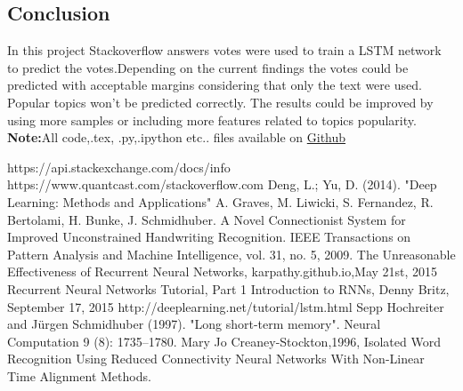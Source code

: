 \documentclass{article}
\begin{document}
\begin{multicols*}{2}
\begin{flushleft}
\section{Conclusion}
In this project Stackoverflow answers votes were used to train a LSTM network to predict the votes.Depending on the current findings the votes could be predicted with acceptable margins considering that only the text were used. Popular topics won't be predicted correctly. The results could be improved by using more samples or including more features related to topics popularity.\\
\textbf{Note:}All code,.tex, .py,.ipython etc.. files available on \href{https://github.com/aqeel13932/RSDM2016/}{Github}
	\begin{thebibliography}{9}
		https://api.stackexchange.com/docs/info
		https://www.quantcast.com/stackoverflow.com
		Deng, L.; Yu, D. (2014). "Deep Learning: Methods and Applications"
		A. Graves, M. Liwicki, S. Fernandez, R. Bertolami, H. Bunke, J. Schmidhuber. A Novel Connectionist System for Improved Unconstrained Handwriting Recognition. IEEE Transactions on Pattern Analysis and Machine Intelligence, vol. 31, no. 5, 2009.
		The Unreasonable Effectiveness of Recurrent Neural Networks,	    karpathy.github.io,May 21st, 2015
		Recurrent Neural Networks Tutorial, Part 1 Introduction to RNNs, Denny Britz, September 17, 2015	
		http://deeplearning.net/tutorial/lstm.html
		 Sepp Hochreiter and Jürgen Schmidhuber (1997). "Long short-term memory". Neural Computation 9 (8): 1735–1780.
		 Mary Jo Creaney-Stockton,1996, Isolated Word Recognition Using Reduced Connectivity Neural Networks With Non-Linear Time Alignment Methods.
		 
	\end{thebibliography}
\end{flushleft}
\end{multicols*}
\end{document}
